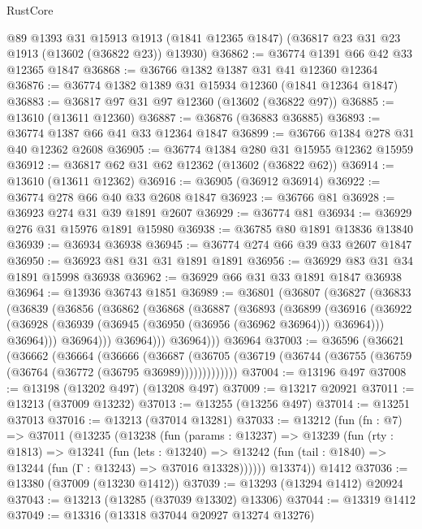 \begin{lexlean}{RustCore}
\begin{coremodule}
    @89
    @1393
    @31
    @15913
    @1913
    (@1841 @12365 @1847)
    (@36817 @23 @31 @23 @1913 (@13602 (@36822 @23)) @13930)
@36862 := @36774 @1391 @66 @42 @33 @12365 @1847
@36868 := @36766 @1382 @1387 @31 @41 @12360 @12364
@36876 := @36774 @1382 @1389 @31 @15934 @12360 (@1841 @12364 @1847)
@36883 := @36817 @97 @31 @97 @12360 (@13602 (@36822 @97))
@36885 := @13610 (@13611 @12360)
@36887 := @36876 (@36883 @36885)
@36893 := @36774 @1387 @66 @41 @33 @12364 @1847
@36899 := @36766 @1384 @278 @31 @40 @12362 @2608
@36905 := @36774 @1384 @280 @31 @15955 @12362 @15959
@36912 := @36817 @62 @31 @62 @12362 (@13602 (@36822 @62))
@36914 := @13610 (@13611 @12362)
@36916 := @36905 (@36912 @36914)
@36922 := @36774 @278 @66 @40 @33 @2608 @1847
@36923 := @36766 @81
@36928 := @36923 @274 @31 @39 @1891 @2607
@36929 := @36774 @81
@36934 := @36929 @276 @31 @15976 @1891 @15980
@36938 := @36785 @80 @1891 @13836 @13840
@36939 := @36934 @36938
@36945 := @36774 @274 @66 @39 @33 @2607 @1847
@36950 := @36923 @81 @31 @31 @1891 @1891
@36956 := @36929 @83 @31 @34 @1891 @15998 @36938
@36962 := @36929 @66 @31 @33 @1891 @1847 @36938
@36964 := @13936 @36743 @1851
@36989 := @36801
    (@36807
      (@36827
        (@36833
          (@36839
            (@36856
              (@36862
                (@36868
                  (@36887
                    (@36893
                      (@36899
                        (@36916
                          (@36922
                            (@36928 (@36939 (@36945 (@36950 (@36956 (@36962 @36964))) @36964)))
                            @36964)))
                      @36964)))
                @36964)))
          @36964)))
    @36964
@37003 := @36596
    (@36621
      (@36662
        (@36664
          (@36666
            (@36687
              (@36705 (@36719 (@36744 (@36755 (@36759 (@36764 (@36772 (@36795 @36989)))))))))))))
@37004 := @13196 @497
@37008 := @13198 (@13202 @497) (@13208 @497)
@37009 := @13217 @20921
@37011 := @13213 (@37009 @13232)
@37013 := @13255 (@13256 @497)
@37014 := @13251 @37013
@37016 := @13213 (@37014 @13281)
@37033 := @13212
    (fun (fn : @7) =>
    @37011
      (@13235
        (@13238
          (fun (params : @13237) =>
          @13239
            (fun (rty : @1813) =>
            @13241
              (fun (lets : @13240) =>
              @13242 (fun (tail : @1840) => @13244 (fun (Γ : @13243) => @37016 @13328))))))
        @13374))
    @1412
@37036 := @13380 (@37009 (@13230 @1412))
@37039 := @13293 (@13294 @1412) @20924
@37043 := @13213 (@13285 (@37039 @13302) @13306)
@37044 := @13319 @1412
@37049 := @13316 (@13318 @37044 @20927 @13274 @13276)

\end{coremodule}
\end{lexlean}
